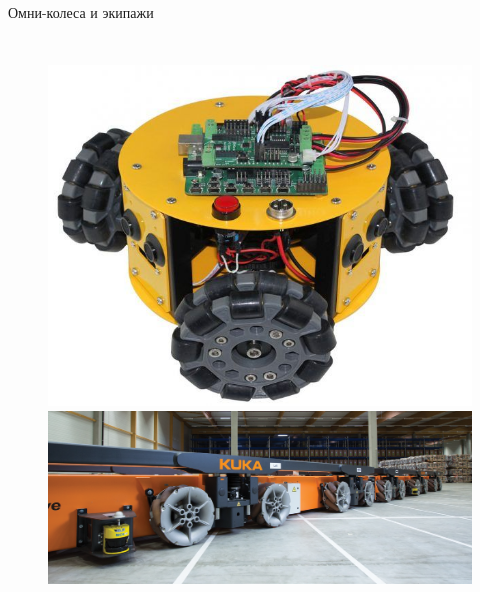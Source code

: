 \begin{frame}{Омни-колеса и экипажи}
\begin{figure}[H]
\begin{columns}
        \end{columns}
    \end{figure}
    \vspace{-10pt}
    \begin{figure}[H]
        \centering
        \begin{columns}
                \centering
                \includegraphics[width=\linewidth]{content/pic/photo/vehicle_three_two_row.jpg}
                \centering
                \includegraphics[width=\linewidth]{content/pic/photo/vehicle_kuka.png}
        \end{columns}
    \end{figure}
\end{frame}
